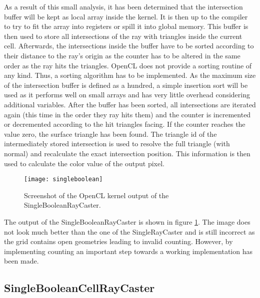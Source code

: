 As a result of this small analysis, it has been determined that the intersection buffer will be kept as local array inside the kernel. It is then up to the compiler to try to fit the array into registers or spill it into global memory. This buffer is then used to store all intersections of the ray with triangles inside the current cell. Afterwards, the intersections inside the buffer have to be sorted according to their distance to the ray's origin as the counter has to be altered in the same order as the ray hits the triangles. OpenCL does not provide a sorting routine of any kind. Thus, a sorting algorithm has to be implemented. As the maximum size of the intersection buffer is defined as a hundred, a simple insertion sort will be used as it performs well on small arrays and has very little overhead considering additional variables. After the buffer has been sorted, all intersections are iterated again (this time in the order they ray hits them) and the counter is incremented or decremented according to the hit triangles facing. If the counter reaches the value zero, the surface triangle has been found. The triangle id of the intermediately stored intersection is used to resolve the full triangle (with normal) and recalculate the exact intersection position. This information is then used to calculate the color value of the output pixel.

\begin{figure}
\centering
\texttt{[image: singleboolean]}
\caption{Screenshot of the OpenCL kernel output of the SingleBooleanRayCaster.}
\label{fig:singleboolean}
\end{figure}

The output of the SingleBooleanRayCaster is shown in figure \ref{fig:singleboolean}. The image does not look much better than the one of the SingleRayCaster and is still incorrect as the grid contains open geometries leading to invalid counting. However, by implementing counting an important step towards a working implementation has been made.

\subsection{SingleBooleanCellRayCaster}

